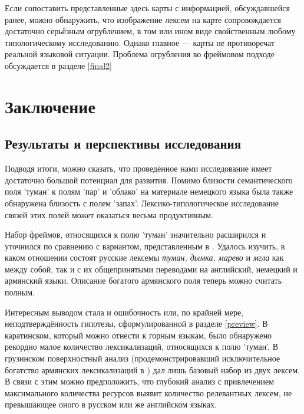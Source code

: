 \par Если сопоставить представленные здесь карты с информацией, обсуждавшейся ранее, можно обнаружить, что изображение лексем на карте сопровождается достаточно серьёзным огрублением, в том или ином виде свойственным любому типологическому исследованию. Однако главное --- карты не противоречат реальной языковой ситуации. Проблема огрубления во фреймовом подходе обсуждается в разделе \ref{final2}


\section{Заключение} \label{final}

\subsection{Результаты и перспективы исследования}

\par Подводя итоги, можно сказать, что проведённое нами исследование имеет достаточно большой потенциал для развития. Помимо близости семантического поля 'туман' к полям 'пар' и 'облако' на материале немецкого языка была также обнаружена близость с полем 'запах'. Лексико-типологическое исследование связей этих полей может оказаться весьма продуктивным.

\par Набор фреймов, относящихся к полю 'туман' значительно расширился и уточнился по сравнению с вариантом, представленным в \citep{соколовский2017}. Удалось изучить, в каком отношении состоят русские лексемы \textit{туман, дымка, марево} и \textit{мгла} как между собой, так и с их общепринятыми переводами на английский, немецкий и армянский языки. Описание богатого армянского поля теперь можно считать полным.

\par Интересным выводом стала и ошибочность или, по крайней мере, неподтверждённость гипотезы, сформулированной в разделе \ref{preview}. В каратинском, который можно отнести к горным языкам, было обнаружено рекордно малое количество лексикализаций, относящихся к полю 'туман'. В грузинском поверхностный анализ (продемонстрировавший исключительное богатство армянских лексикализаций в \citep{соколовский2017}) дал лишь базовый набор из двух лексем. В связи с этим можно предположить, что глубокий анализ с привлечением максимального количества ресурсов выявит количество релевантных лексем, не превышающее оного в русском или же английском языках.

